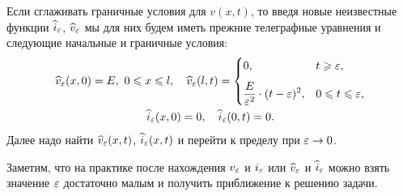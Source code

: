\begin{enumerateD}
	Если сглаживать граничные условия для $v(x,t)$, то введя новые неизвестные функции $\widehat{i}_{\varepsilon}$, $\widehat{v}_{\varepsilon}$ мы для них будем иметь прежние телеграфные уравнения и следующие начальные и граничные условия:
	\begin{gather*}
		\widehat{v}_{\varepsilon}(x,0)=E,\ 0\leqslant x\leqslant l,\quad \widehat{v}_{\varepsilon}(l,t)=\begin{cases}
			0,& t\geqslant\varepsilon,\\[7pt]
			\displaystyle \frac{E}{\varepsilon^2}\cdot(t-\varepsilon)^2,&0\leqslant t\leqslant\varepsilon,
		\end{cases}\\ \widehat{i}_{\varepsilon}(x,0)=0,\quad\widehat{i}_{\varepsilon}(0,t)=0. 
	\end{gather*} 
	Далее надо найти $\widehat{v}_{\varepsilon}(x,t)$, $\widehat{i}_{\varepsilon}(x,t)$ и перейти к пределу при $\varepsilon\to0$.
\end{enumerateD}  

Заметим, что на практике после нахождения $v_{\varepsilon}$ и $i_{\varepsilon}$ или $\widehat{v}_{\varepsilon}$ и $\widehat{i}_{\varepsilon}$ можно взять значение $\varepsilon$ достаточно малым и получить приближение к решению задачи.
